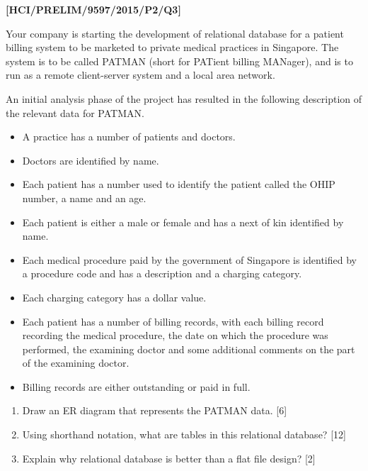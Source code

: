 \item \textbf{{[}HCI/PRELIM/9597/2015/P2/Q3{]} }

Your company is starting the development of relational database for
a patient billing system to be marketed to private medical practices
in Singapore. The system is to be called PATMAN (short for PATient
billing MANager), and is to run as a remote client-server system and
a local area network. 

An initial analysis phase of the project has resulted in the following
description of the relevant data for PATMAN. 
\begin{itemize}
\item A practice has a number of patients and doctors. 
\item Doctors are identified by name.
\item Each patient has a number used to identify the patient called the
OHIP number, a name and an age.
\item Each patient is either a male or female and has a next of kin identified
by name.
\item Each medical procedure paid by the government of Singapore is identified
by a procedure code and has a description and a charging category.
\item Each charging category has a dollar value. 
\item Each patient has a number of billing records, with each billing record
recording the medical procedure, the date on which the procedure was
performed, the examining doctor and some additional comments on the
part of the examining doctor.
\item Billing records are either outstanding or paid in full.
\end{itemize}
\begin{enumerate}
\item Draw an ER diagram that represents the PATMAN data. \hfill{}{[}6{]}
\item Using shorthand notation, what are tables in this relational database?\hfill{}
{[}12{]}
\item Explain why relational database is better than a flat file design?\hfill{}
{[}2{]}
\end{enumerate}